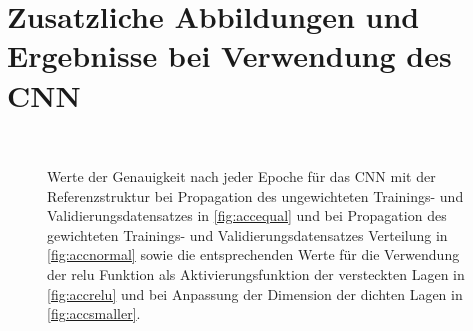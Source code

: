 \section{Zusatzliche Abbildungen und Ergebnisse bei Verwendung des CNN}


\begin{figure}
 \centering
  \begin{subfigure}[Ungewichteter Datensatz]{
 \texttt{[image: fig/Appendix\_CNN/accuracyhistoryequal.pdf]} \label{fig:accequal}}
  \end{subfigure}
 \begin{subfigure}[Gewichteter Datensatz]{
 \texttt{[image: fig/Appendix\_CNN/accuracyhistorynormal.pdf]}\label{fig:accnormal}}
  \end{subfigure} \\
  \begin{subfigure}[relu statt elu als Aktivierungsfunktion]{
 \texttt{[image: fig/Appendix\_CNN/accuracyhistoryrelu.pdf]}\label{fig:accrelu}}
  \end{subfigure}
 \begin{subfigure}[Verkleinerte Dimensionen der dichten Lagen]{
 \texttt{[image: fig/Appendix\_CNN/accuracyhistorysmaller.pdf]}\label{fig:accsmaller}}
  \end{subfigure}
  \caption{Werte der Genauigkeit nach jeder Epoche für das CNN mit der Referenzstruktur bei Propagation des ungewichteten Trainings- und Validierungsdatensatzes in \ref{fig:accequal} und bei Propagation des gewichteten Trainings- und Validierungsdatensatzes Verteilung in \ref{fig:accnormal} sowie die entsprechenden Werte für die Verwendung der relu Funktion als Aktivierungsfunktion der versteckten Lagen in \ref{fig:accrelu} und bei Anpassung der Dimension der dichten Lagen in \ref{fig:accsmaller}.}
\end{figure}

